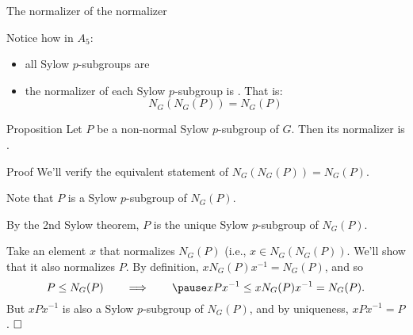 \documentclass[8pt]{beamer}
\newcommand{\Pause}{\pause}      %
\begin{document}
\begin{frame}{The normalizer of the normalizer}

  Notice how in $A_5$:
  \begin{itemize}
  \item all Sylow $p$-subgroups are  \Pause
  \item the normalizer of each Sylow $p$-subgroup is . \Pause That is:
    \[
    N_G(N_G(P))=N_G(P)
    \]
  \end{itemize}

  \vspace{-2mm}\Pause
  
  \begin{block}{Proposition}
    Let $P$ be a non-normal Sylow $p$-subgroup of $G$. Then its
    normalizer is .
  \end{block}
  
  \begin{exampleblock}{Proof} \Pause
    We'll verify the equivalent statement of
    $N_G(N_G(P))=N_G(P)$. \medskip\pause

    Note that $P$ is a  Sylow $p$-subgroup of
    $N_G(P)$. \medskip\Pause

    By the 2nd Sylow theorem, $P$ is the unique Sylow $p$-subgroup of
    $N_G(P)$. \medskip\pause
    
    Take an element $x$ that normalizes $N_G(P)$ (i.e., $x\in
    N_G(N_G(P))$. \Pause We'll show that it also normalizes $P$. \Pause By
    definition, $xN_G(P)x^{-1}=N_G(P)$, and so
    \[
    P\leq N_G(P)\qquad\Longrightarrow\qquad\Pause
    xPx^{-1}\leq xN_G(P)x^{-1}=N_G(P).
    \]
    \pause But $xPx^{-1}$ is also a Sylow $p$-subgroup of $N_G(P)$,
    and by uniqueness, $xPx^{-1}=P$. $\hfill\Box$
  \end{exampleblock}

\end{frame}

\end{document}

